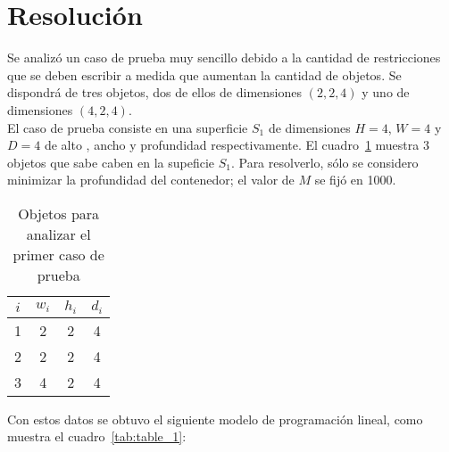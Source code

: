 \section{Resolución\label{sec:resolucion}}
Se analizó un caso de prueba muy sencillo debido a la cantidad de restricciones
que se deben escribir a medida que aumentan la cantidad de objetos. Se dispondrá
de tres objetos, dos de ellos de dimensiones $(2, 2, 4)$ y uno de dimensiones $(4, 2, 4)$.\\

El caso de prueba consiste en una superficie $S_1$ de dimensiones
$H=4$, $W=4$ y $D=4$ de alto , ancho y profundidad respectivamente. El
cuadro~\ref{tabla:dos} muestra $3$ objetos que sabe caben en la
supeficie $S_1$. Para resolverlo, sólo se considero minimizar la profundidad
del contenedor; el valor de $M$ se fijó en 1000.

\begin{table}[h]
\begin{center}
\begin{tabular}{||c|c c c||}
\hline\hline
$i$ & $w_i$ & $h_i$ & $d_i$ \\ \hline
1 & 2 & 2 & 4 \\
2 & 2 & 2 & 4 \\
3 & 4 & 2 & 4 \\ \hline\hline
\end{tabular}
\caption{Objetos para analizar el primer caso de prueba}
\label{tabla:dos}
\end{center}
\end{table}

Con estos datos se obtuvo el siguiente modelo de programación lineal, como muestra
el cuadro~\ref{tab:table_1}:\\


